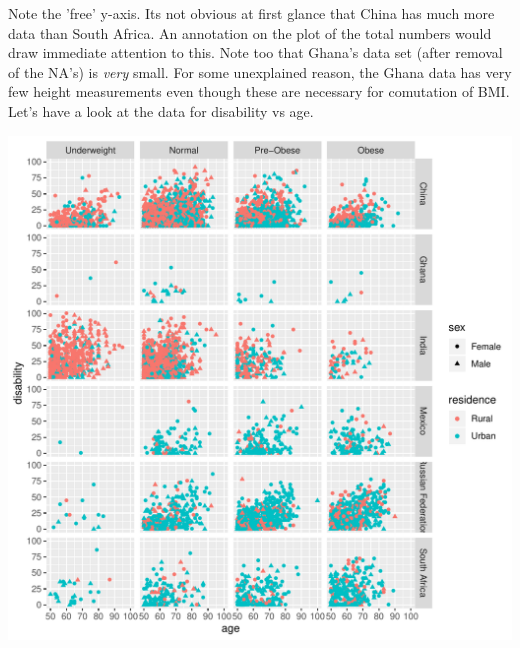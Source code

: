 \documentclass[titlepage]{book}\usepackage{knitr}
\begin{document}
Note the 'free' y-axis. Its not obvious at first glance that China has much more data than South Africa.  An annotation on the plot of the total numbers would draw immediate attention to this. Note too that Ghana's data set (after removal of the NA's) is \textsl{very} small. For some unexplained reason, the Ghana data has very few height measurements even though these are necessary for comutation of BMI.
Let's have a look at the data for disability vs age.

\begin{knitrout}
\color{fgcolor}
\includegraphics[width=\maxwidth]{figure/L1ScatterFacet-1} 

\end{knitrout}
\end{document}
